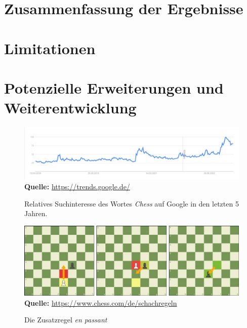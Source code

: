 \documentclass[a4paper,12pt]{report}
\begin{document}
    \section{Zusammenfassung der Ergebnisse}
    \section{Limitationen}
    \section{Potenzielle Erweiterungen und Weiterentwicklung}

\appendix

\listoffigures
\begin{figure}[ht]
\raggedleft
  \includegraphics[width=160mm]{Schachentwicklung.jpg}
    \footnotesize\sffamily\textbf{Quelle:} \url{https://trends.google.de/}
  \caption{Relatives Suchinteresse des Wortes \textit{Chess} auf Google in den letzten 5 Jahren.}
  \label{fig:Schachinteresse}
\end{figure}
  
  \begin{figure}[ht]
\raggedleft
  \includegraphics[width=160mm]{en-passant.jpeg}
    \footnotesize\sffamily\textbf{Quelle:} \url{https://www.chess.com/de/schachregeln}
  \caption{Die Zusatzregel \textit{en passant}}
  \label{fig:en-passant}
\end{figure}
\end{document}
